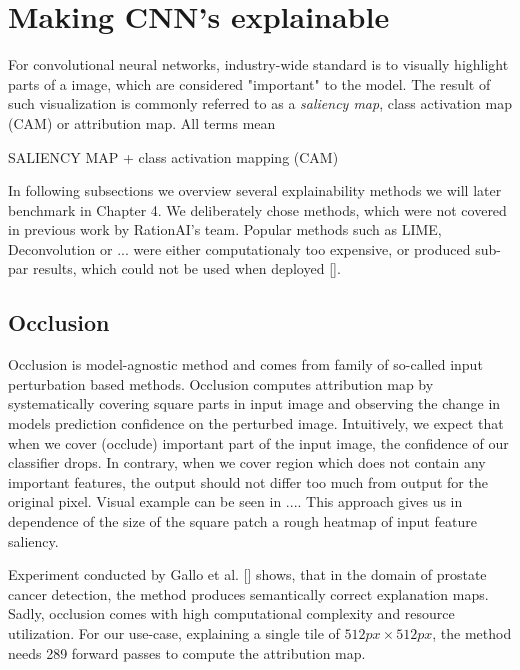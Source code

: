 
\section{Making CNN's explainable}




For convolutional neural networks, industry-wide standard is to visually highlight parts of a image, which are considered "important" to the model. The result of such visualization is commonly referred to as a \emph{saliency map}, class activation map (CAM) or attribution map. All terms mean 

SALIENCY MAP + class activation mapping (CAM)

\noindent
In following subsections we overview several explainability methods we will later benchmark in Chapter 4. We deliberately chose methods, which were not covered in previous work by RationAI's team. Popular methods such as LIME, Deconvolution or ...  were either computationaly too expensive, or produced sub-par results, which could not be used when deployed [].



\subsection{Occlusion}

Occlusion is model-agnostic method and comes from family of so-called input perturbation based methods. Occlusion computes attribution map by systematically covering square parts in input image and observing the change in models prediction confidence on the perturbed image. Intuitively, we expect that when we cover (occlude) important part of the input image, the confidence of our classifier drops. In contrary, when we cover region which does not contain any important features, the output should not differ too much from output for the original pixel. Visual example can be seen in .... This approach gives us in dependence of the size of the square patch a rough heatmap of input feature saliency.

Experiment conducted by Gallo et al. [] shows, that in the domain of prostate cancer detection, the method produces semantically correct explanation maps. Sadly, occlusion comes with high computational complexity and resource utilization. For our use-case, explaining a single tile of $512px \times 512px$, the method needs 289 forward passes to compute the attribution map. 

